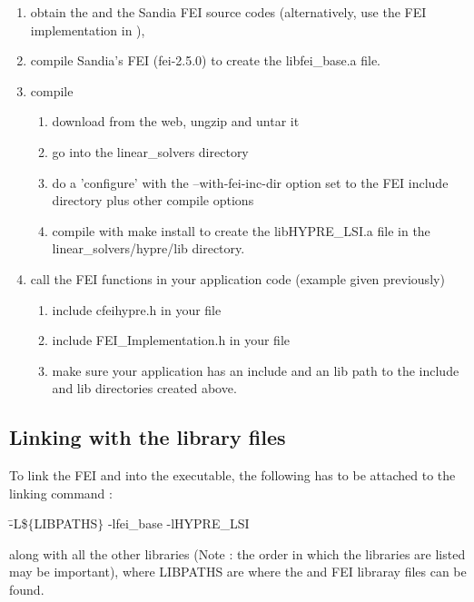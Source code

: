 \begin{enumerate}

\item obtain the \hypre{} and the Sandia FEI source codes (alternatively, use
      the {\sf FEI} implementation in \hypre{}),
\item compile Sandia's {\sf FEI} (fei-2.5.0) to create the
      {\sf libfei\_base.a} file.
\item compile \hypre{} 
\begin{enumerate}
\item download \hypre{} from the web, ungzip and untar it
\item go into the {\sf linear\_solvers} directory
\item do a 'configure' with the {\sf --with-fei-inc-dir} option set to
      the {\sf FEI} include directory plus other compile options
\item compile with {\sf make install} to create the
      {\sf libHYPRE\_LSI.a} file in the {\sf linear\_solvers/hypre/lib}
      directory.
\end{enumerate}
\item call the {\sf FEI} functions in your application code (example given
      previously)
\begin{enumerate}
\item include {\sf cfei\-hypre.h} in your file 
\item include {\sf FEI\_Implementation.h} in your file 
\item make sure your application has an {\sf include} and an {\sf lib} path 
      to the {\sf include} and {\sf lib} directories created above. 
\end{enumerate}

\end{enumerate}

\subsection{Linking with the library files}

To link the {\sf FEI} and \hypre{} into the executable, the following has to be
attached to the linking command :

\begin{tabbing}
\hspace{0.5in} \= {\sf -L\$$\{$LIBPATHS$\}$ -lfei\_base -lHYPRE\_LSI} 
\end{tabbing}
along with all the other libraries (Note : the order in which the libraries are
listed may be important), where {\sf LIBPATHS} are where 
the \hypre{} and {\sf FEI} libraray files can be found.  

